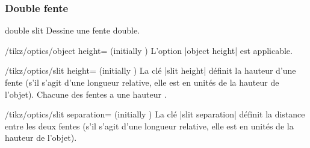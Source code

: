\documentclass[a4paper]{ltxdoc}
\begin{document}
\subsubsection{Double fente}


\begin{shape}{double slit}
Dessine une fente double.

\begin{codeexample}[width=5cm]
\end{codeexample}

\begin{key}{/tikz/optics/object height= (initially )}
    L'option |object height| est applicable.
\end{key}


\begin{key}{/tikz/optics/slit height= (initially )}
La clé |slit height| définit la hauteur d'une fente (s'il s'agit d'une longueur relative, elle est en unités de la hauteur de l'objet). 
Chacune des fentes a une hauteur . 

\begin{codeexample}[width=5cm]
\end{codeexample}
\end{key}

\begin{key}{/tikz/optics/slit separation= (initially )}
La clé |slit separation| définit la distance entre les deux fentes (s'il s'agit d'une longueur relative, elle est en unités de la hauteur de l'objet).

\begin{codeexample}[width=5cm]
\end{codeexample}
\end{key}




\end{shape}
\end{document}
